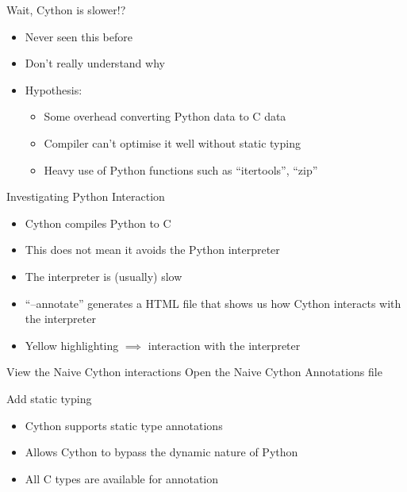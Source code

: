\documentclass[12pt,xcolor=dvipsnames]{beamer}
\begin{document}
    \begin{frame}{Wait, Cython is slower!?}
        \begin{itemize}
            \item Never seen this before
            \item Don’t really understand why
            \item Hypothesis:
            \begin{itemize}
                \item Some overhead converting Python data to C data
                \item Compiler can’t optimise it well without static typing
                \item Heavy use of Python functions such as ``itertools'', ``zip''
            \end{itemize}
        \end{itemize}
    \end{frame}

    \begin{frame}{Investigating Python Interaction}
        \begin{itemize}
            \item Cython compiles Python to C
            \item This does not mean it avoids the Python interpreter
            \item The interpreter is (usually) slow
            \item ``--annotate'' generates a HTML file that shows us how Cython interacts with the interpreter
            \item Yellow highlighting $\implies$ interaction with the interpreter
        \end{itemize}
    \end{frame}

    \begin{frame}{View the Naive Cython interactions}
        Open the Naive Cython Annotations file
    \end{frame}

    \begin{frame}{Add static typing}
        \begin{itemize}
            \item Cython supports static type annotations
            \item Allows Cython to bypass the dynamic nature of Python
            \item All C types are available for annotation
        \end{itemize}
    \end{frame}
\end{document}
